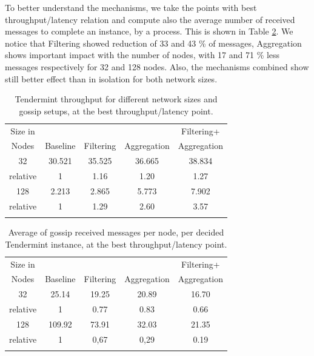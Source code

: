 To better understand the mechanisms, we take the points with best throughput/latency relation and compute also the average number of received messages to complete an instance, by a process. This is 
shown in Table \ref{tab:msgsRcvdPerInstance}.   We notice that Filtering showed reduction 
of 33 and 43 \% of messages, Aggregation shows important impact with the number of nodes,
with 17 and 71 \% less messages respectively for 32 and 128 nodes.    Also, the mechanisms combined show still better effect than in isolation for both network sizes.


\begin{table}[h!]
\centering
	\begin{tabular}{c c c c c }
	\hline
     Size in     &        &       &       & Filtering+  \\ 
	 Nodes & Baseline   & Filtering    & Aggregation    & Aggregation  \\  \hline
	32  		& 		30.521		&	35.525	&	36.665	&  38.834 \\
	relative   		& 		  1		&	1.16	&	1.20	&  1.27      \\ \hline
	128  		& 		2.213		&	2.865	&	5.773	&  7.902  \\  
	relative   		& 		  1		&	1.29	&	2.60	&  3.57  \\ \hline \\
 
	\end{tabular}
	\caption{Tendermint throughput for different network sizes and  gossip setups, at the best throughput/latency point.}
 \label{tab:sturationPoints}
\end{table}


\begin{table}[h!]
\center
	\begin{tabular}{c c c c c }
	\hline
     Size in     &        &       &       & Filtering+  \\ 
	 Nodes & Baseline   & Filtering     & Aggregation    & Aggregation  \\  \hline
	32  		& 		25.14        &	19.25	&	20.89	&  16.70 \\
 	relative   	& 		  1		     &	0.77	&	0.83	&  0.66      \\ \hline
	128  		& 		109.92	     &	73.91	&	32.03	&  21.35  \\ 
 	relative   	& 		  1		     &	0,67	&	0,29	&  0.19      \\ \hline \\
	\end{tabular}
	\caption{Average of gossip received messages per node, per decided Tendermint instance, at the best throughput/latency point.}
  \label{tab:msgsRcvdPerInstance}
\end{table}

